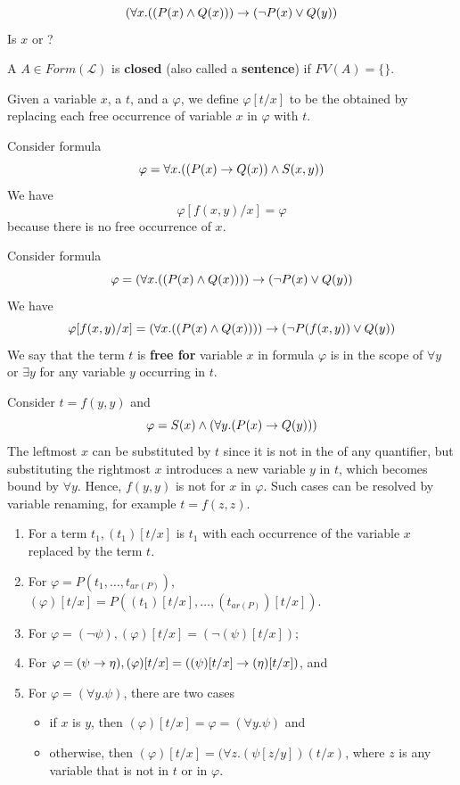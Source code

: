 \documentclass[english, 11pt]{article}
\begin{document}
  \[ (\forall x.((P(x) \land Q(x))) \rightarrow (\neg P(x) \lor Q(y)) \]
  Is $x$  or ? \\
  \begin{defn}[closed]\label{closed}
  A  $A \in Form(\mathcal{L})$ is \textbf{closed} (also called a \textbf{sentence}) if $FV(A) = \{\}$.
  \end{defn}
  \begin{defn}[substitution]\label{substitution}
  Given a variable $x$, a  $t$, and a  $\varphi$, we define $\varphi[t/x]$ to be the  obtained by replacing each free occurrence of variable $x$ in $\varphi$ with $t$.
  \begin{exmp}Consider formula
  \[ \varphi = \forall x.((P(x) \rightarrow Q(x)) \land S(x,y)) \]
    We have
    \[ \varphi[f(x,y)/x] = \varphi \]
    because there is no free occurrence of $x$.
  \end{exmp}
  \end{defn}
  \begin{exmp}
    Consider formula
    \[ \varphi = (\forall x.((P(x) \land Q(x)))) \rightarrow (\neg P(x) \lor Q(y)) \]
    We have
    \[ \varphi[f(x,y)/x] = (\forall x.((P(x) \land Q(x)))) \rightarrow (\neg P(f(x,y)) \lor Q(y)) \]
    We say that the term $t$ is \textbf{free for} variable $x$ in formula $\varphi$ is in the scope of $\forall y$ or $\exists y$ for any variable $y$ occurring in $t$.
  \end{exmp}
  \begin{exmp}
    Consider  $t = f(y,y)$ and 
    \[ \varphi = S(x) \land (\forall y.(P(x) \rightarrow Q(y))) \]
    The leftmost $x$ can be substituted by $t$ since it is not in the  of any quantifier, but substituting the rightmost $x$ introduces a new variable $y$ in $t$, which becomes bound by $\forall y$. Hence, $f(y,y)$ is not  for $x$ in $\varphi$. Such cases can be resolved by variable renaming, for example $t = f(z,z)$.
  \end{exmp}
  \begin{enumerate}
    \item For a term $t_1, (t_1)[t/x]$ is $t_1$ with each occurrence of the variable $x$ replaced by the term $t$.
    \item For $\varphi = P(t_1, \ldots, t_{ar(P)})$, $(\varphi)[t/x] = P((t_1)[t/x],\ldots,(t_{ar(P)})[t/x]).$
    \item For $\varphi = (\neg \psi), (\varphi)[t/x] = (\neg (\psi)[t/x]);$
    \item For $\varphi = (\psi \rightarrow \eta), (\varphi)[t/x] = ((\psi)[t/x] \rightarrow (\eta)[t/x])$, and
    \item For $\varphi = (\forall y.\psi)$, there are two cases
    \begin{itemize}
      \item if $x$ is $y$, then $(\varphi)[t/x] = \varphi = (\forall y.\psi)$ and
      \item otherwise, then $(\varphi)[t/x] = (\forall z. (\psi [z/y])(t/x)$, where $z$ is any variable that is not  in $t$ or in $\varphi$.
    \end{itemize}
  \end{enumerate}
\end{document}
